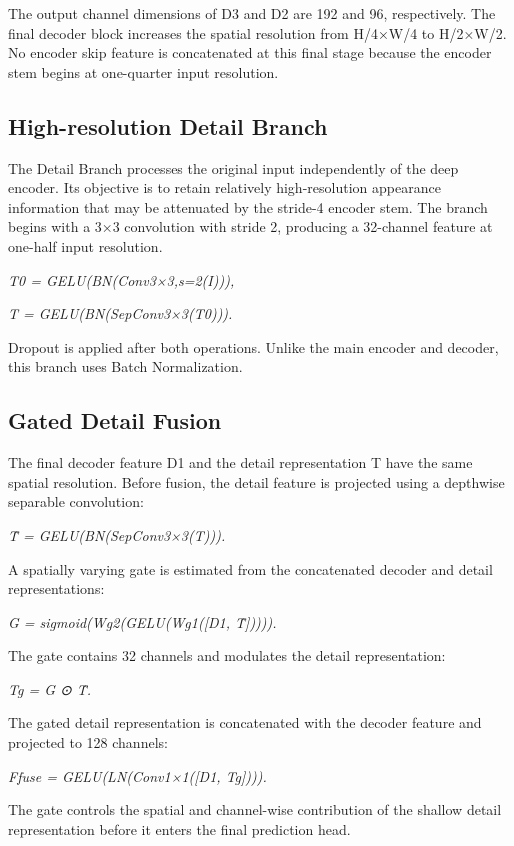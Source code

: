 The output channel dimensions of D3 and D2 are 192 and 96, respectively.
The final decoder block increases the spatial resolution from H/4×W/4 to
H/2×W/2. No encoder skip feature is concatenated at this final stage
because the encoder stem begins at one-quarter input resolution.

\subsection{High-resolution Detail
Branch}\label{high-resolution-detail-branch}

The Detail Branch processes the original input independently of the deep
encoder. Its objective is to retain relatively high-resolution
appearance information that may be attenuated by the stride-4 encoder
stem. The branch begins with a 3×3 convolution with stride 2, producing
a 32-channel feature at one-half input resolution.

\emph{T0 = GELU(BN(Conv3×3,s=2(I))),}

\emph{T = GELU(BN(SepConv3×3(T0))).}

Dropout is applied after both operations. Unlike the main encoder and
decoder, this branch uses Batch Normalization.

\subsection{Gated Detail Fusion}\label{gated-detail-fusion}

The final decoder feature D1 and the detail representation T have the
same spatial resolution. Before fusion, the detail feature is projected
using a depthwise separable convolution:

\emph{T̂ = GELU(BN(SepConv3×3(T))).}

A spatially varying gate is estimated from the concatenated decoder and
detail representations:

\emph{G = sigmoid(Wg2(GELU(Wg1({[}D1, T̂{]})))).}

The gate contains 32 channels and modulates the detail representation:

\emph{Tg = G ⊙ T̂.}

The gated detail representation is concatenated with the decoder feature
and projected to 128 channels:

\emph{Ffuse = GELU(LN(Conv1×1({[}D1, Tg{]}))).}

The gate controls the spatial and channel-wise contribution of the
shallow detail representation before it enters the final prediction
head.

